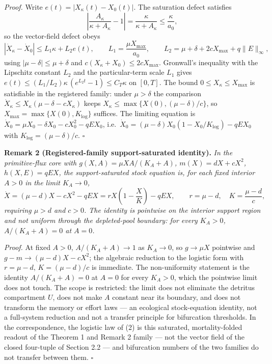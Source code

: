 \documentclass[11pt]{article}
\begin{document}
\emph{Proof.} Write \(e(t) = |X_\kappa(t) - X_0(t)|\). The saturation
defect satisfies
\[\left| \frac{A_\kappa}{\kappa + A_\kappa} - 1 \right| = \frac{\kappa}{\kappa + A_\kappa} \le \frac{\kappa}{a_0},\]
so the vector-field defect obeys
\[|\dot X_\kappa - \dot X_0| \le L_1 \kappa + L_2 e(t), \qquad L_1 = \frac{\mu X_{\max}}{a_0}, \qquad L_2 = \mu + \delta + 2cX_{\max} + q\|E\|_\infty,\]
using \(|\mu - \delta| \le \mu + \delta\) and
\(c(X_\kappa + X_0) \le 2cX_{\max}\). Gronwall's inequality with the
Lipschitz constant \(L_2\) and the particular-term scale \(L_1\) gives
\(e(t) \le (L_1/\allowbreak{}L_2)\kappa\,(e^{L_2 t} - 1) \le C_T \kappa\) on
\([0,T]\). The bound \(0 \le X_\kappa \le X_{\max}\) is satisfiable in
the registered family: under \(\mu > \delta\) the comparison
\(\dot X_\kappa \le X_\kappa(\mu - \delta - cX_\kappa)\) keeps
\(X_\kappa \le \max\{X(0), (\mu-\delta)/c\}\), so
\(X_{\max} = \max\{X(0), K_{\log}\}\) suffices. The limiting equation is
\(\dot X_0 = \mu X_0 - \delta X_0 - cX_0^2 - qE X_0\),
i.e.~\(\dot X_0 = (\mu - \delta)X_0 (1 - X_0/\allowbreak{}K_{\log}) - qE X_0\) with
\(K_{\log} = (\mu - \delta)/c\). \ensuremath{\square}

\textbf{Remark 2 (Registered-family support-saturated identity).}
\emph{In the primitive-flux core with \(g(X,A) = \mu XA/(K_A + A)\),
\(m(X) = dX + cX^2\), \(h(X,E) = qEX\), the support-saturated stock
equation is, for each fixed interior \(A > 0\) in the limit
\(K_A \to 0\),}
\[\dot X = (\mu - d)X - cX^2 - qEX = rX\left(1 - \frac{X}{K}\right) - qEX, \qquad r = \mu - d, \quad K = \frac{\mu - d}{c},\]
\emph{requiring \(\mu > d\) and \(c > 0\). The identity is pointwise on
the interior support region and not uniform through the depleted-pool
boundary: for every \(K_A > 0\), \(A/(K_A + A) = 0\) at \(A = 0\).}

\emph{Proof.} At fixed \(A > 0\), \(A/(K_A + A) \to 1\) as
\(K_A \to 0\), so \(g \to \mu X\) pointwise and
\(g - m \to (\mu - d)X - cX^2\); the algebraic reduction to the logistic
form with \(r = \mu - d\), \(K = (\mu - d)/c\) is immediate. The
non-uniformity statement is the identity \(A/(K_A + A) = 0\) at
\(A = 0\) for every \(K_A > 0\), which the pointwise limit does not
touch. The scope is restricted: the limit does not eliminate the
detritus compartment \(U\), does not make \(A\) constant near its
boundary, and does not transform the memory or effort laws --- an
ecological stock-equation identity, not a full-system reduction and not
a transfer principle for bifurcation thresholds. In the correspondence,
the logistic law of (2) is this saturated, mortality-folded readout of
the Theorem 1 and Remark 2 family --- not the vector field of the closed
four-tuple of Section 2.2 --- and bifurcation numbers of the two
families do not transfer between them. \ensuremath{\square}
\end{document}
